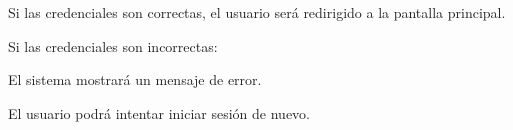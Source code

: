\begin{RFGestionUsuarios}
\begin{RFGestionUsuarios}
      \item Si las credenciales son correctas, el usuario será redirigido a la pantalla principal.
	  \item Si las credenciales son incorrectas:
		\begin{RFGestionUsuarios}
			\item El sistema mostrará un mensaje de error.
			\item El usuario podrá intentar iniciar sesión de nuevo.
		\end{RFGestionUsuarios}
    \end{RFGestionUsuarios}

\end{RFGestionUsuarios}